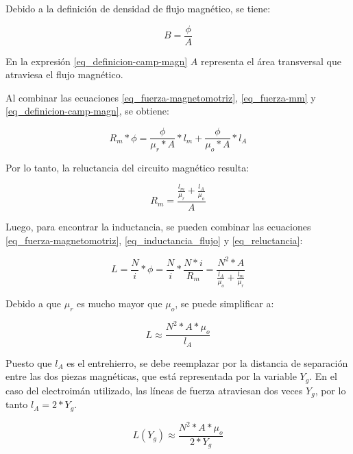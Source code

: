 \noindent Debido a la definición de  densidad de flujo magnético, se tiene:

\begin{equation}\label{eq_definicion-camp-magn}
	B=\frac{\phi}{A}
\end{equation}

En la expresión \ref{eq_definicion-camp-magn} $A$ representa el área transversal que atraviesa el flujo magnético.

Al combinar las ecuaciones \ref{eq_fuerza-magnetomotriz}, \ref{eq_fuerza-mm} y \ref{eq_definicion-camp-magn}, se obtiene:

\begin{equation}
	R_{m}*\phi=\frac{\phi}{\mu_{r}*A}*l_{m}+\frac{\phi}{\mu_{o}*A}*l_{A}
\end{equation}

Por lo tanto, la reluctancia del circuito magnético resulta:

\begin{equation} \label{eq_reluctancia}
	R_{m}=\frac{\frac{l_{m}}{\mu_{r}}+\frac{l_{A}}{\mu_{o}}}{A}
\end{equation}

\noindent Luego, para encontrar la inductancia, se pueden combinar las ecuaciones  \ref{eq_fuerza-magnetomotriz}, \ref{eq_inductancia_flujo} y \ref{eq_reluctancia}:

\begin{equation}\label{eq_inductancia_2}
	L=\frac{N}{i}*\phi=\frac{N}{i}*\frac{N*i}{R_{m}}=\frac{N^{2}*A}{\frac{l_{A}}{\mu_{o}}+\frac{l_{m}}{\mu_{r}}}
\end{equation}

\noindent Debido a que $\mu_{r}$ es mucho mayor que $\mu_{o}$, se puede simplificar a:

\begin{equation} \label{eq_inductancia_gap}
	L\approx\frac{N^{2}*A*\mu_{o}}{l_{A}}
\end{equation}

\noindent \noindent Puesto que $l_{A}$ es el entrehierro, se debe reemplazar por la distancia de separación entre las dos piezas magnéticas, que está representada por la variable $Y_{g}$. En el caso del electroimán utilizado, las líneas de fuerza atraviesan dos veces $Y_{g}$, por lo tanto $l_{A}=2*Y_{g}$.


\begin{equation}\label{eq_inductancia_vs_y}
	L(Y_g)\approx\frac{{N^{2}*A*\mu_{o}}}{2*Y_{g}}
\end{equation}

